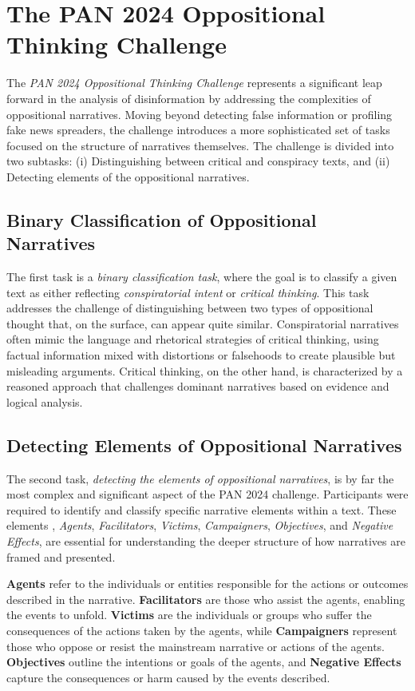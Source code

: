 \documentclass{Configuration_Files/PoliMi3i_thesis}
\begin{document}
\section{The PAN 2024 Oppositional Thinking Challenge} \label{sec
} The \textit{PAN 2024 Oppositional Thinking Challenge} represents a significant leap forward in the analysis of disinformation by addressing the complexities of oppositional narratives. Moving beyond detecting false information or profiling fake news spreaders, the challenge introduces a more sophisticated set of tasks focused on the structure of narratives themselves. The challenge is divided into two subtasks: (i) Distinguishing between critical and conspiracy texts, and (ii) Detecting elements of the oppositional narratives.

\subsection{Binary Classification of Oppositional Narratives} \label{subsec
} The first task is a \textit{binary classification task}, where the goal is to classify a given text as either reflecting \textit{conspiratorial intent} or \textit{critical thinking}. This task addresses the challenge of distinguishing between two types of oppositional thought that, on the surface, can appear quite similar. Conspiratorial narratives often mimic the language and rhetorical strategies of critical thinking, using factual information mixed with distortions or falsehoods to create plausible but misleading arguments. Critical thinking, on the other hand, is characterized by a reasoned approach that challenges dominant narratives based on evidence and logical analysis.

\subsection{Detecting Elements of Oppositional Narratives} \label{subsec} The second task, \textit{detecting the elements of oppositional narratives}, is by far the most complex and significant aspect of the PAN 2024 challenge. Participants were required to identify and classify specific narrative elements within a text. These elements \cite{korenvcic2024distinguishes}, \textit{Agents}, \textit{Facilitators}, \textit{Victims}, \textit{Campaigners}, \textit{Objectives}, and \textit{Negative Effects}, are essential for understanding the deeper structure of how narratives are framed and presented.

\textbf{Agents} refer to the individuals or entities responsible for the actions or outcomes described in the narrative. \textbf{Facilitators} are those who assist the agents, enabling the events to unfold. \textbf{Victims} are the individuals or groups who suffer the consequences of the actions taken by the agents, while \textbf{Campaigners} represent those who oppose or resist the mainstream narrative or actions of the agents. \textbf{Objectives} outline the intentions or goals of the agents, and \textbf{Negative Effects} capture the consequences or harm caused by the events described.
\end{document}
